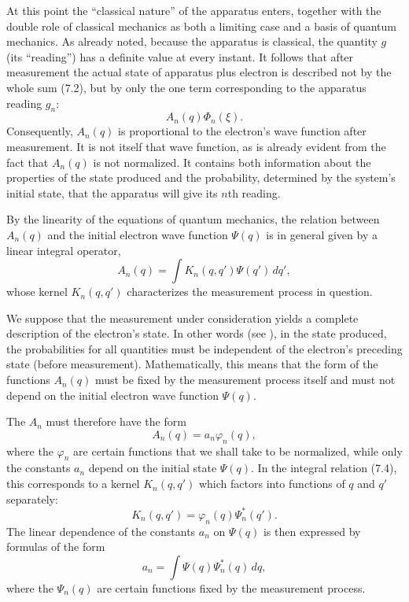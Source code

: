 At this point the ``classical nature'' of the apparatus enters, together with
the double role of classical mechanics as both a limiting case and a basis of
quantum mechanics. As already noted, because the apparatus is classical, the
quantity $g$ (its ``reading'') has a definite value at every instant. It
follows that after measurement the actual state of apparatus plus electron is
described not by the whole sum (7.2), but by only the one term corresponding
to the apparatus reading $g_n$:
\begin{equation}
  A_n(q)\Phi_n(\xi).
  \tag{7.3}
\end{equation}
Consequently, $A_n(q)$ is proportional to the electron's wave function after
measurement. It is not itself that wave function, as is already evident from
the fact that $A_n(q)$ is not normalized. It contains both information about
the properties of the state produced and the probability, determined by the
system's initial state, that the apparatus will give its $n$th reading.

By the linearity of the equations of quantum mechanics, the relation between
$A_n(q)$ and the initial electron wave function $\Psi(q)$ is in general given
by a linear integral operator,
\begin{equation}
  A_n(q)=\int K_n(q,q')\Psi(q')\,dq',
  \tag{7.4}
\end{equation}
whose kernel $K_n(q,q')$ characterizes the measurement process in question.

We suppose that the measurement under consideration yields a complete
description of the electron's state. In other words (see ), in the state
produced, the probabilities for all quantities must be independent of the
electron's preceding state (before measurement). Mathematically, this means
that the form of the functions $A_n(q)$ must be fixed by the measurement
process itself and must not depend on the initial electron wave function
$\Psi(q)$.

The $A_n$ must therefore have the form
\begin{equation}
  A_n(q)=a_n\varphi_n(q),
  \tag{7.5}
\end{equation}
where the $\varphi_n$ are certain functions that we shall take to be
normalized, while only the constants $a_n$ depend on the initial state
$\Psi(q)$. In the integral relation (7.4), this corresponds to a kernel
$K_n(q,q')$ which factors into functions of $q$ and $q'$ separately:
\begin{equation}
  K_n(q,q')=\varphi_n(q)\Psi_n^*(q').
  \tag{7.6}
\end{equation}
The linear dependence of the constants $a_n$ on $\Psi(q)$ is then expressed
by formulas of the form
\begin{equation}
  a_n=\int\Psi(q)\Psi_n^*(q)\,dq,
  \tag{7.7}
\end{equation}
where the $\Psi_n(q)$ are certain functions fixed by the measurement process.


